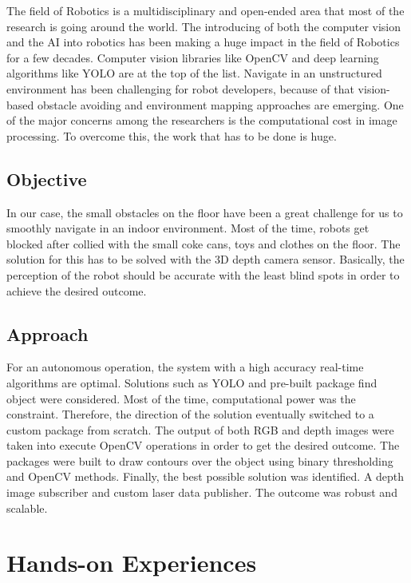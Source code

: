 \documentclass[twoside,12pt,times,onecolumn,a4paper]{report}
\begin{document}
\hspace{3em}The field of Robotics is a multidisciplinary and open-ended area that most of 
the research is going around the world. The introducing of both the computer vision 
and the AI into robotics has been making a huge impact in the field of Robotics for 
a few decades. Computer vision libraries like OpenCV and deep learning 
algorithms like YOLO are at the top of the list. Navigate in an unstructured 
environment has been challenging for robot developers, because of that vision-based obstacle avoiding and environment mapping approaches are emerging. One 
of the major concerns among the researchers is the computational cost in image 
processing. To overcome this, the work that has to be done is huge.

\section{Objective}

In our case, the small obstacles on the floor have been a great challenge for 
us to smoothly navigate in an indoor environment. Most of the time, robots get 
blocked after collied with the small coke cans, toys and clothes on the floor. 
The solution for this has to be solved with the 3D depth camera sensor. Basically, 
the perception of the robot should be accurate with the least blind spots in order to 
achieve the desired outcome. 

\section{Approach}

For an autonomous operation, the system with a high accuracy real-time algorithms are optimal. Solutions such as YOLO and pre-built package 
find object were considered. Most of the time, computational power was the 
constraint. Therefore, the direction of the solution eventually switched to a custom 
package from scratch. The output of both RGB and depth images were taken into 
execute OpenCV operations in order to get the desired outcome. The packages 
were built to draw contours over the object using binary thresholding and OpenCV 
methods. Finally, the best possible solution was identified. A depth image 
subscriber and custom laser data publisher. The outcome was robust and scalable.

\chapter{Hands-on Experiences}
\end{document}
